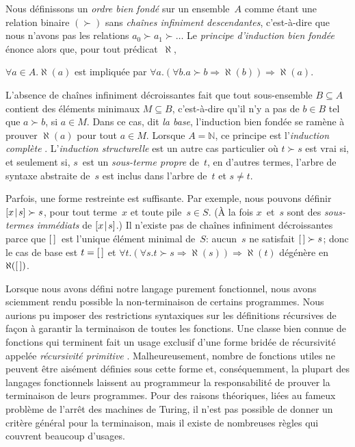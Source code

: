 Nous définissons un \emph{ordre bien fondé}
\citep{Winskel_1993} sur un
ensemble~\(A\) comme étant une relation binaire \((\succ)\) sans
\emph{chaînes infiniment descendantes}, c'est-à-dire que nous n'avons pas les
relations \(a_0 \succ a_1 \succ \dots\) Le \emph{principe d'induction
bien fondée} énonce alors que, pour tout prédicat~\(\aleph\),
\begin{center}
  \(\forall a \in A.\aleph(a)\) est impliquée par
\(\forall a.(\forall b.a \succ b \Rightarrow \aleph(b)) \Rightarrow
\aleph(a)\).
\end{center}
L'absence de chaînes infiniment décroissantes fait que
tout sous-ensemble \(B \subseteq A\) contient des éléments minimaux
\(M \subseteq B\), c'est-à-dire qu'il n'y a pas de \(b \in B\) tel que
\(a \succ b\), si \(a \in M\). Dans ce cas, dit \emph{la base},
l'induction bien fondée se ramène à prouver \(\aleph(a)\) pour tout
\(a \in M\). Lorsque \(A=\mathbb{N}\), ce principe est
l'\emph{induction complète} \citep{Buck_1963}. L'\emph{induction structurelle} est un autre cas particulier où \(t \succ s\) est vrai
si, et seulement si, \(s\)~est un \emph{sous-terme
  propre}
de~\(t\), en d'autres termes, l'arbre de syntaxe abstraite de~\(s\)
est inclus dans l'arbre de~\(t\) et \(s \neq t\).

Parfois, une forme restreinte est suffisante. Par exemple, nous
pouvons définir \([{x}\!\mid\!{s}] \succ s\), pour
tout terme~\(x\) et toute pile~\(s \in S\). (À la fois \(x\)~et~\(s\)
sont des \emph{sous-termes immédiats}
de \([{x}\!\mid\!{s}]\).) Il n'existe pas de
chaînes infiniment décroissantes parce que \([\,]\)~est l'unique
élément minimal de~\(S\): aucun~\(s\) ne satisfait \([\,] \succ s\);
donc le cas de base est \(t=[\,]\) et \(\forall t.(\forall s.t \succ s
\Rightarrow \aleph(s)) \Rightarrow \aleph(t)\) dégénère en
\(\aleph([\,])\).

\label{par:ackermann}

Lorsque nous avons défini notre langage purement fonctionnel, nous
avons sciemment rendu possible la non-terminaison de certains
programmes. Nous aurions pu imposer des restrictions syntaxiques sur
les définitions récursives de façon à garantir la terminaison de
toutes les fonctions. Une classe bien connue de fonctions qui
terminent fait un usage exclusif d'une forme bridée de récursivité
appelée \emph{récursivité primitive}
\citep{Robinson_1947,Robinson_1948}. Malheureusement, nombre de fonctions utiles ne peuvent
être aisément définies sous cette forme et, conséquemment, la plupart
des langages fonctionnels laissent au programmeur la responsabilité de
prouver la terminaison de leurs programmes. Pour des raisons
théoriques, liées au fameux problème de l'arrêt des machines de
Turing, il n'est pas possible de donner un critère général pour la
terminaison, mais il existe de nombreuses règles qui couvrent beaucoup
d'usages.


